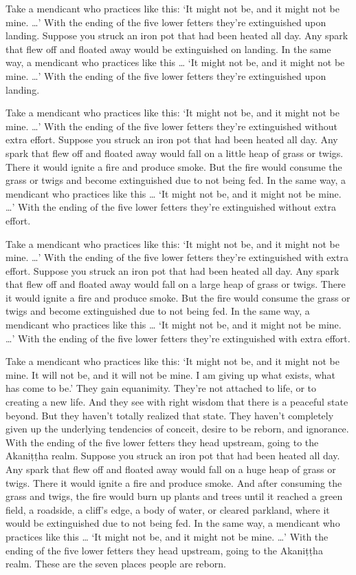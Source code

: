 \documentclass[12pt,openany]{book}%
\begin{document}
Take a mendicant who practices like this: ‘It might not be, and it might not be mine. …’ With the ending of the five lower fetters they’re extinguished upon landing. Suppose you struck an iron pot that had been heated all day. Any spark that flew off and floated away would be extinguished on landing. In the same way, a mendicant who practices like this … ‘It might not be, and it might not be mine. …’ With the ending of the five lower fetters they’re extinguished upon landing. 

Take a mendicant who practices like this: ‘It might not be, and it might not be mine. …’ With the ending of the five lower fetters they’re extinguished without extra effort. Suppose you struck an iron pot that had been heated all day. Any spark that flew off and floated away would fall on a little heap of grass or twigs. There it would ignite a fire and produce smoke. But the fire would consume the grass or twigs and become extinguished due to not being fed. In the same way, a mendicant who practices like this … ‘It might not be, and it might not be mine. …’ With the ending of the five lower fetters they’re extinguished without extra effort. 

Take a mendicant who practices like this: ‘It might not be, and it might not be mine. …’ With the ending of the five lower fetters they’re extinguished with extra effort. Suppose you struck an iron pot that had been heated all day. Any spark that flew off and floated away would fall on a large heap of grass or twigs. There it would ignite a fire and produce smoke. But the fire would consume the grass or twigs and become extinguished due to not being fed. In the same way, a mendicant who practices like this … ‘It might not be, and it might not be mine. …’ With the ending of the five lower fetters they’re extinguished with extra effort. 

Take a mendicant who practices like this: ‘It might not be, and it might not be mine. It will not be, and it will not be mine. I am giving up what exists, what has come to be.’ They gain equanimity. They’re not attached to life, or to creating a new life. And they see with right wisdom that there is a peaceful state beyond. But they haven’t totally realized that state. They haven’t completely given up the underlying tendencies of conceit, desire to be reborn, and ignorance. With the ending of the five lower fetters they head upstream, going to the \textsanskrit{Akaniṭṭha} realm. Suppose you struck an iron pot that had been heated all day. Any spark that flew off and floated away would fall on a huge heap of grass or twigs. There it would ignite a fire and produce smoke. And after consuming the grass and twigs, the fire would burn up plants and trees until it reached a green field, a roadside, a cliff’s edge, a body of water, or cleared parkland, where it would be extinguished due to not being fed. In the same way, a mendicant who practices like this … ‘It might not be, and it might not be mine. …’ With the ending of the five lower fetters they head upstream, going to the \textsanskrit{Akaniṭṭha} realm. These are the seven places people are reborn. 
\end{document}
